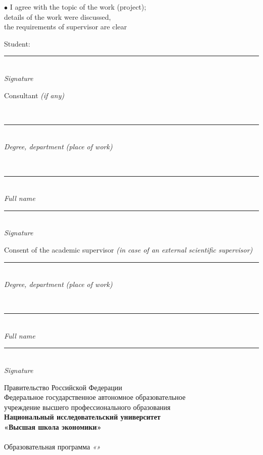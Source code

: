 \documentclass[12pt,a4paper]{article}
\newcommand{\hseSignField}[2]{%
  \begin{minipage}[t]{#1}\centering
    \rule{\linewidth}{0.4pt}\\[-2pt]{\footnotesize\itshape #2}
  \end{minipage}}
\newcommand{\hseFilledField}[3]{%
  \begin{minipage}[t]{#1}\centering
    {\small\strut #2}\\[-4pt]\rule{\linewidth}{0.4pt}\\[-2pt]{\footnotesize\itshape #3}
  \end{minipage}}
\begin{document}
\vspace{0.5cm}
\begin{minipage}[t]{0.55\textwidth}
$\bullet$ I agree with the topic of the work (project);\\
details of the work were discussed,\\
the requirements of supervisor are clear
\end{minipage}\hfill
\begin{minipage}[t]{0.4\textwidth}
\vspace{0.5cm}
Student: \hfill \hseSignField{0.5\textwidth}{Signature}
\end{minipage}

\ifhseHasCoSupervisor
\vspace{0.5cm}
\begin{minipage}[t]{0.27\textwidth}\raggedright Consultant {\itshape(if any)}\end{minipage}%
\hseFilledField{0.3\textwidth}{\foreignlanguage{russian}{\hseCoSupervisorTitle\ifdefempty{\hseCoSupervisorDegree}{}{, \hseCoSupervisorDegree}}}{Degree, department (place of work)}\hfill
\hseFilledField{0.22\textwidth}{\foreignlanguage{russian}{\hseCoSupervisorShortName}}{Full name}\hfill
\hseSignField{0.15\textwidth}{Signature}
\fi

\ifhseExternalSupervisor
\vspace{0.5cm}
\begin{minipage}[t]{0.27\textwidth}\raggedright Consent of the academic supervisor {\itshape(in case of an external scientific supervisor)}\end{minipage}%
\hseSignField{0.3\textwidth}{Degree, department (place of work)}\hfill
\hseFilledField{0.22\textwidth}{\foreignlanguage{russian}{\hseAcademicSupervisorShortNameEn}}{Full name}\hfill
\hseSignField{0.15\textwidth}{Signature}
\fi

\vfill
\begin{center}\hseCityYear\end{center}

\else
\begin{center}
Правительство Российской Федерации\\[4pt]
Федеральное государственное автономное образовательное\\
учреждение высшего профессионального образования\\[4pt]
\textbf{Национальный исследовательский университет}\\
\textbf{«Высшая школа экономики»}\\[4pt]
\textbf{\hseFaculty}\\[4pt]
Образовательная программа \textit{«\hseSpecialization»}
\end{center}
\end{document}
